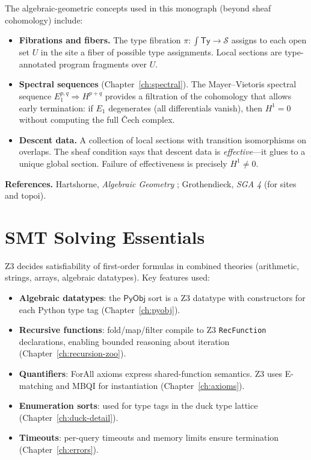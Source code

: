 \documentclass[11pt,a4paper]{report}
\theoremstyle{definition}
\theoremstyle{plain}
\newcommand{\PyObj}{\mathsf{PyObj}}
\newcommand{\Hone}{H^1}
\newcommand{\site}{\mathcal{S}}
\begin{document}
The algebraic-geometric concepts used in this monograph (beyond
sheaf cohomology) include:

\begin{itemize}
  \item \textbf{Fibrations and fibers.}
    The type fibration $\pi : \int \mathsf{Ty} \to \site$ assigns
    to each open set $U$ in the site a fiber of possible type
    assignments.  Local sections are type-annotated program fragments
    over $U$.

  \item \textbf{Spectral sequences} (Chapter~\ref{ch:spectral}).
    The Mayer--Vietoris spectral sequence
    $E_1^{p,q} \Rightarrow H^{p+q}$ provides a filtration of the
    cohomology that allows early termination: if $E_1$ degenerates
    (all differentials vanish), then $\Hone = 0$ without computing
    the full \v{C}ech complex.

  \item \textbf{Descent data.}
    A collection of local sections with transition isomorphisms
    on overlaps.  The sheaf condition says that descent data is
    \emph{effective}---it glues to a unique global section.
    Failure of effectiveness is precisely $\Hone \neq 0$.
\end{itemize}

\noindent
\textbf{References.}
Hartshorne, \emph{Algebraic Geometry} \cite{hartshorne1977};
Grothendieck, \emph{SGA 4} (for sites and topoi).

\section{SMT Solving Essentials}

Z3 decides satisfiability of first-order formulas in combined theories
(arithmetic, strings, arrays, algebraic datatypes).  Key features
used:
\begin{itemize}
  \item \textbf{Algebraic datatypes}: the $\PyObj$ sort is a Z3
    datatype with constructors for each Python type tag
    (Chapter~\ref{ch:pyobj}).
  \item \textbf{Recursive functions}: fold/map/filter compile to Z3
    \texttt{RecFunction} declarations, enabling bounded reasoning
    about iteration (Chapter~\ref{ch:recursion-zoo}).
  \item \textbf{Quantifiers}: ForAll axioms express shared-function
    semantics.  Z3 uses E-matching and MBQI for instantiation
    (Chapter~\ref{ch:axioms}).
  \item \textbf{Enumeration sorts}: used for type tags in the duck
    type lattice (Chapter~\ref{ch:duck-detail}).
  \item \textbf{Timeouts}: per-query timeouts and memory limits
    ensure termination (Chapter~\ref{ch:errors}).
\end{itemize}
\end{document}

